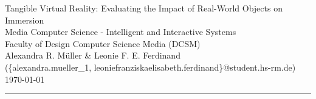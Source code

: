 \documentclass[12pt,english]{report}
\begin{document}


{\noindent\Huge Tangible Virtual Reality: Evaluating the Impact of Real-World Objects on Immersion}\\
{Media Computer Science {-} Intelligent and Interactive Systems}\\
{Faculty of Design Computer Science Media (DCSM)}\\[0.5cm]
{Alexandra R. Müller \& Leonie F. E. Ferdinand}\\
{(\{alexandra.mueller\_1, leoniefranziskaelisabeth.ferdinand\}@student.hs-rm.de)}\\
{\today}\\
\noindent\rule{\textwidth}{0.2pt}



\appendix
\clearpage
{}
\printbibliography[heading=bibintoc]
\end{document}
